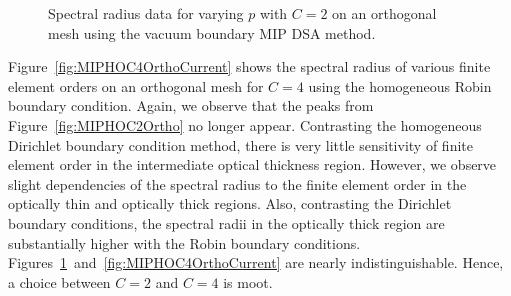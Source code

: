 \documentclass[12pt]{article}
\begin{document}
\begin{figure}[!hbt]
\centering
{}
\caption{Spectral radius data for varying $p$ with $C=2$ on an orthogonal mesh using the vacuum boundary MIP DSA method.}
\label{fig:MIPHOC2OrthoCurrent}
\end{figure}

Figure~\ref{fig:MIPHOC4OrthoCurrent} shows the spectral radius of various finite element orders on an orthogonal mesh for $C=4$ using the homogeneous Robin boundary condition. Again, we observe that the peaks from Figure~\ref{fig:MIPHOC2Ortho} no longer appear. Contrasting the homogeneous Dirichlet boundary condition method, there is very little sensitivity of finite element order in the intermediate optical thickness region. However, we observe slight dependencies of the spectral radius to the finite element order in the optically thin and optically thick regions. Also, contrasting the Dirichlet boundary conditions, the spectral radii in the optically thick region are substantially higher with the Robin boundary conditions. Figures~\ref{fig:MIPHOC2OrthoCurrent}~and~\ref{fig:MIPHOC4OrthoCurrent} are nearly indistinguishable. Hence, a choice between $C=2$ and $C=4$ is moot.
\end{document}
